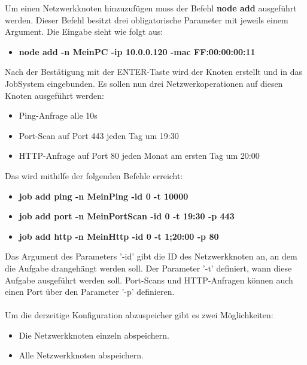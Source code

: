 \documentclass[12pt,a4paper]{report}
\begin{document}
\begin{onehalfspace}
Um einen Netzwerkknoten hinzuzufügen muss der Befehl \textbf{node add} ausgeführt werden. Dieser Befehl besitzt drei obligatorische Parameter mit jeweils einem Argument. Die Eingabe sieht wie folgt aus:\\

\begin{itemize}
\item \textbf{node add -n MeinPC -ip 10.0.0.120 -mac FF:00:00:00:11}\\
\end{itemize}

Nach der Bestätigung mit der ENTER-Taste wird der Knoten erstellt und in das JobSystem eingebunden. Es sollen nun drei Netzwerkoperationen auf diesen Knoten ausgeführt werden:

\begin{itemize}
\item Ping-Anfrage alle 10s
\item Port-Scan auf Port 443 jeden Tag um 19:30
\item HTTP-Anfrage auf Port 80 jeden Monat am ersten Tag um 20:00
\end{itemize}

Das wird mithilfe der folgenden Befehle erreicht:\\

\begin{itemize}
\item \textbf{job add ping -n MeinPing -id 0 -t 10000}
\item \textbf{job add port -n MeinPortScan -id 0 -t 19:30 -p 443}
\item \textbf{job add http -n MeinHttp -id 0 -t 1;20:00 -p 80}
\end{itemize}

Das Argument des Parameters '-id' gibt die ID des Netzwerkknoten an, an dem die Aufgabe drangehängt werden soll. Der Parameter '-t' definiert, wann diese Aufgabe ausgeführt werden soll. Port-Scans und HTTP-Anfragen können auch einen Port über den Parameter '-p' definieren.\\\\

Um die derzeitige Konfiguration abzuspeicher gibt es zwei Möglichkeiten:

\begin{itemize}
\item Die Netzwerkknoten einzeln abspeichern.
\item Alle Netzwerkknoten abspeichern.
\end{itemize}


\end{onehalfspace}
\end{document}
